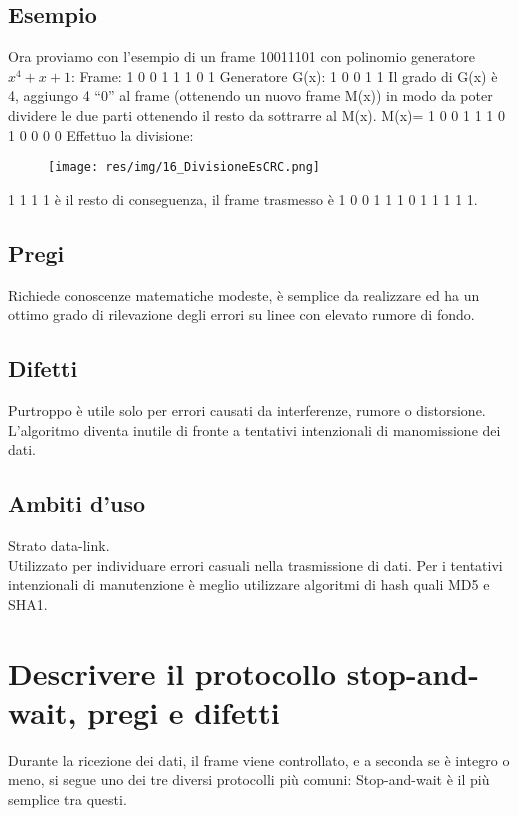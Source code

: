 \subsection{Esempio}
Ora proviamo con l'esempio di un frame 10011101 con polinomio generatore $x^4+x+1$:
Frame: 1 0 0 1 1 1 0 1 
Generatore G(x): 1 0 0 1 1
Il grado di G(x) è 4, aggiungo 4 “0” al frame (ottenendo un nuovo frame M(x)) in modo da poter dividere le due parti ottenendo il resto da sottrarre al M(x).
M(x)= 1 0 0 1 1 1 0 1 0 0 0 0
Effettuo la divisione: 

\begin{figure}[H]
\centering
\texttt{[image: res/img/16\_DivisioneEsCRC.png]}
\end{figure}
             
1 1 1 1 è il resto di conseguenza, il frame trasmesso è 1 0 0 1  1 1 0 1  1 1 1 1.

\subsection{Pregi}
Richiede conoscenze matematiche modeste, è semplice da realizzare ed ha un ottimo grado di rilevazione degli errori su linee con elevato rumore di fondo.

\subsection{Difetti}
Purtroppo è utile solo per errori causati da interferenze, rumore o distorsione.
L'algoritmo diventa inutile di fronte a tentativi intenzionali di manomissione dei dati.

\subsection{Ambiti d'uso}
Strato data-link.\\
Utilizzato per individuare errori casuali nella trasmissione di dati.
Per i tentativi intenzionali di manutenzione è meglio utilizzare algoritmi di hash quali MD5 e SHA1.

\section{Descrivere il protocollo stop-and-wait, pregi e difetti}

Durante la ricezione dei dati, il frame viene controllato, e a seconda se è integro o meno, si segue uno dei tre diversi protocolli più comuni: 
Stop-and-wait è il più semplice tra questi.
